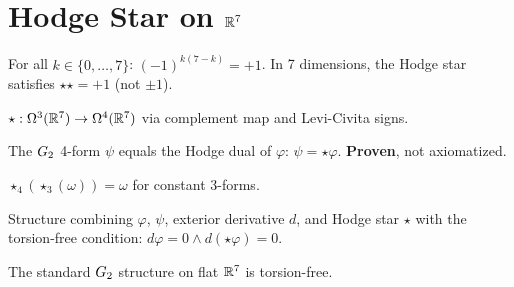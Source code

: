 \section{Hodge Star on $\mathbb{R}^7$}

\begin{theorem}\label{thm:starstar_sign}
    \leanok
    For all $k \in \{0, \ldots, 7\}$:
    $(-1)^{k(7-k)} = +1$.
    In 7 dimensions, the Hodge star satisfies $\star\star = +1$ (not $\pm 1$).
\end{theorem}

\begin{definition}\label{def:star3}
    \leanok
    $\star : \Omega^3(\mathbb{R}^7) \to \Omega^4(\mathbb{R}^7)$ via complement map and Levi-Civita signs.
\end{definition}

\begin{theorem}[$\psi = \star\varphi$ (Proven)]\label{thm:psi_eq_star_phi}
    \leanok
    The $G_2$ 4-form $\psi$ equals the Hodge dual of $\varphi$:
    $\psi = \star\varphi$. \textbf{Proven}, not axiomatized.
\end{theorem}

\begin{theorem}\label{thm:hodge_invol}
    \leanok
    $\star_4(\star_3(\omega)) = \omega$ for constant 3-forms.
\end{theorem}

\begin{definition}\label{def:g2geomdata}
    \leanok
    Structure combining $\varphi$, $\psi$, exterior derivative $d$, and Hodge star $\star$
    with the torsion-free condition: $d\varphi = 0 \wedge d(\star\varphi) = 0$.
\end{definition}

\begin{theorem}\label{thm:standardG2Geom_tf}
    \leanok
    The standard $G_2$ structure on flat $\mathbb{R}^7$ is torsion-free.
\end{theorem}


